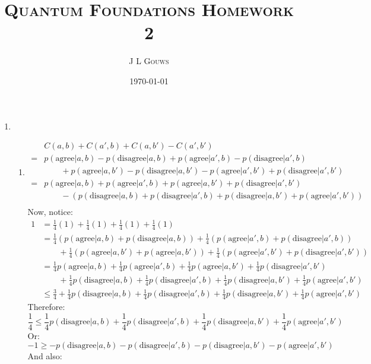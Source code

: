 \documentclass[12pt,a4]{article}
\title{
\textsc{Quantum Foundations Homework 2}
}
\author{\textsc{J L Gouws}
}
\date{\today
\\[1cm]}
\begin{document}
\thispagestyle{empty}

\maketitle

\begin{enumerate}
  \item
    \begin{enumerate}
      \item
        \begin{align*}
          & C(a, b) + C(a', b) + C(a, b') - C(a', b')\\
        = & p(\text{agree}|a, b) - p(\text{disagree}|a, b) + p(\text{agree}|a', b) - p(\text{disagree}|a', b)\\
          & \qquad + p(\text{agree}|a, b') - p(\text{disagree}|a, b') - p(\text{agree}|a', b') + p(\text{disagree}|a', b')\\
        = & p(\text{agree}|a, b) + p(\text{agree}|a', b) + p(\text{agree}|a, b')  + p(\text{disagree}|a', b')\\
          & \qquad  - (p(\text{disagree}|a, b) + p(\text{disagree}|a', b)+ p(\text{disagree}|a, b') + p(\text{agree}|a', b'))\\
        \end{align*}
        Now, notice:
        \begin{align*}
          1 &= \frac{1}{4} (1) + \frac{1}{4} (1) + \frac{1}{4} (1)  + \frac{1}{4}(1)  \\
            &= \frac{1}{4}(p(\text{agree}|a, b) + p(\text{disagree}|a, b)) + \frac{1}{4} (p(\text{agree}|a', b) + p(\text{disagree}|a', b))\\
            &\qquad + \frac{1}{4} (p(\text{agree}|a, b') + p(\text{agree}|a, b'))  + \frac{1}{4}(p(\text{agree}|a', b') + p(\text{disagree}|a', b')) \\
            &= \frac{1}{4}p(\text{agree}|a, b) + \frac{1}{4} p(\text{agree}|a', b) + \frac{1}{4}p(\text{agree}|a, b') + \frac{1}{4}p(\text{disagree}|a', b') \\
            &\qquad + \frac{1}{4} p(\text{disagree}|a, b) + \frac{1}{4} p(\text{disagree}|a', b) + \frac{1}{4} p(\text{disagree}|a, b')  + \frac{1}{4}p(\text{agree}|a', b') \\
            &\le \frac{3}{4} + \frac{1}{4} p(\text{disagree}|a, b) + \frac{1}{4} p(\text{disagree}|a', b) + \frac{1}{4} p(\text{disagree}|a, b')  + \frac{1}{4}p(\text{agree}|a', b')
        \end{align*}
        Therefore:
        \begin{equation*}
          \frac{1}{4} \le \frac{1}{4} p(\text{disagree}|a, b) + \frac{1}{4} p(\text{disagree}|a', b) + \frac{1}{4} p(\text{disagree}|a, b')  + \frac{1}{4}p(\text{agree}|a', b')
        \end{equation*}
        Or:
        \begin{equation*}
          - 1 \ge - p(\text{disagree}|a, b) - p(\text{disagree}|a', b) - p(\text{disagree}|a, b') - p(\text{agree}|a', b')
        \end{equation*}
        And also:


\end{enumerate}
\end{enumerate}
\end{document}

